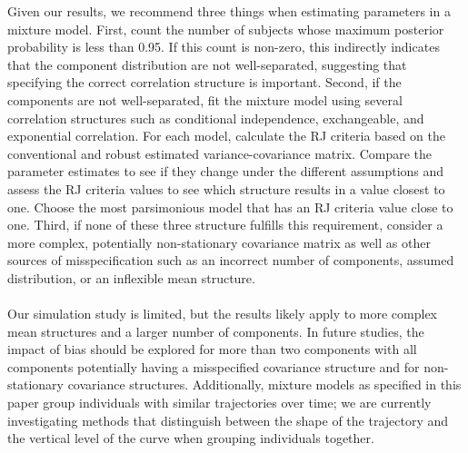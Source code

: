 \documentclass[10pt]{article}
\begin{document}
Given our results, we recommend three things when estimating parameters in a mixture model. First, count the number of subjects whose maximum posterior probability is less than 0.95. If this count is non-zero, this indirectly indicates that the component distribution are not well-separated, suggesting that specifying the correct correlation structure is important. Second, if the components are not well-separated, fit the mixture model using several correlation structures such as conditional independence, exchangeable, and exponential correlation. For each model, calculate the RJ criteria based on the conventional and robust estimated variance-covariance matrix.  Compare the parameter estimates to see if they change under the different assumptions and assess the RJ criteria values to see which structure results in a value closest to one. Choose the most parsimonious model that has an RJ criteria value close to one.  Third, if none of these three structure fulfills this requirement, consider a more complex, potentially non-stationary covariance matrix as well as other sources of misspecification such as an incorrect number of components, assumed distribution, or an inflexible mean structure.\\\\
Our simulation study is limited, but the results likely apply to more complex mean structures and a larger number of components. In future studies, the impact of bias should be explored for more than two components with all components potentially having a misspecified covariance structure and for non-stationary covariance structures. Additionally, mixture models as specified in this paper group individuals with similar trajectories over time; we are currently investigating methods that distinguish between the shape of the trajectory and the vertical level of the curve when grouping individuals together.
	
	
\clearpage
\end{document}
